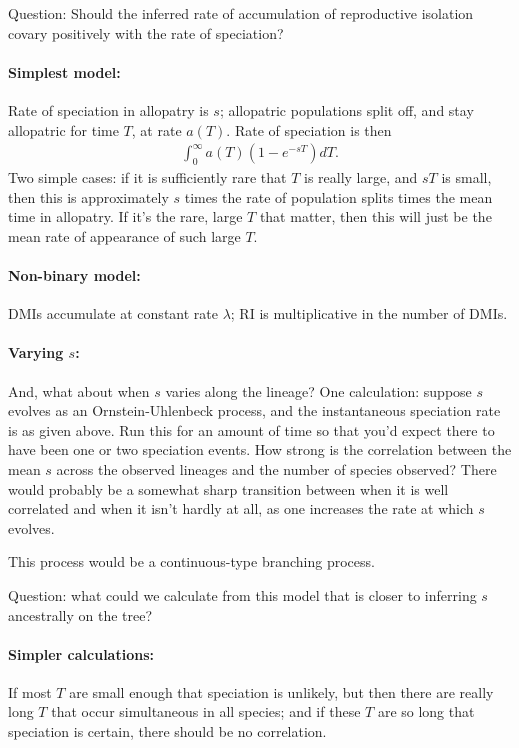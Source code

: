 \documentclass{article}
\begin{document}
Question: Should the inferred rate of accumulation of reproductive isolation covary positively with the rate of speciation?


\paragraph{Simplest model:} Rate of speciation in allopatry is $s$;
allopatric populations split off, and stay allopatric for time $T$, at rate $a(T)$.
Rate of speciation is then
\begin{align}
  \int_0^\infty a(T) (1-e^{-sT}) dT .
\end{align}
Two simple cases: if it is sufficiently rare that $T$ is really large,
and $sT$ is small, then this is approximately $s$ times the rate of population splits times the mean time in allopatry.
If it's the rare, large $T$ that matter, then this will just be the mean rate of appearance of such large $T$.


\paragraph{Non-binary model:} DMIs accumulate at constant rate $\lambda$;
RI is multiplicative in the number of DMIs.


\paragraph{Varying $s$:}
And, what about when $s$ varies along the lineage?
One calculation: suppose $s$ evolves as an Ornstein-Uhlenbeck process,
and the instantaneous speciation rate is as given above.
Run this for an amount of time so that you'd expect there to have been one or two speciation events.
How strong is the correlation between the mean $s$ across the observed lineages and the number of species observed?
There would probably be a somewhat sharp transition between when it is well correlated and when it isn't hardly at all, 
as one increases the rate at which $s$ evolves.

This process would be a continuous-type branching process.

Question: what could we calculate from this model that is closer to inferring $s$ ancestrally on the tree?

\paragraph{Simpler calculations:}
If most $T$ are small enough that speciation is unlikely,
but then there are really long $T$ that occur simultaneous in all species;
and if these $T$ are so long that speciation is certain,
there should be no correlation.
\end{document}
